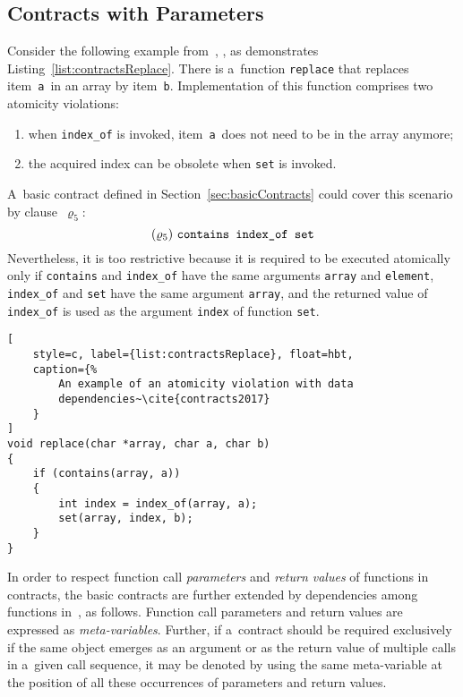 \subsection{Contracts with Parameters}
\label{sec:parameterContracts}

\begin{example}
    Consider the following example from~\cite{contracts2017},
    \cite{contracts2015}, as demonstrates Listing~\ref{list:contractsReplace}.
    There is a~function \texttt{replace} that replaces item~\texttt{a}~in an
    array by item~\texttt{b}. Implementation of this function comprises two
    atomicity violations:
    \begin{enumerate}[label={(\roman*)}]
        \item
            when \texttt{index\_of} is invoked, item~\texttt{a}~does not need to
            be in the array anymore;

        \item
            the acquired index can be obsolete when \texttt{set} is invoked.
    \end{enumerate}
    A~basic contract defined in Section~\ref{sec:basicContracts} could cover
    this scenario by clause~$ \varrho_5 $:
    $$ (\varrho_5)\ \text{\texttt{contains index\_of set}} $$
    Nevertheless, it is too restrictive because it is required to be executed
    atomically only if \texttt{contains} and \texttt{index\_of} have the same
    arguments \texttt{array} and \texttt{element}, \texttt{index\_of} and
    \texttt{set} have the same argument \texttt{array}, and the returned value of
    \texttt{index\_of} is used as the argument \texttt{index} of function
    \texttt{set}.
\end{example}

\begin{lstlisting}[
    style=c, label={list:contractsReplace}, float=hbt,
    caption={%
        An example of an atomicity violation with data
        dependencies~\cite{contracts2017}
    }
]
void replace(char *array, char a, char b)
{
    if (contains(array, a))
    {
        int index = index_of(array, a);
        set(array, index, b);
    }
}
\end{lstlisting}

In order to respect function call \emph{parameters} and \emph{return values}
of functions in contracts, the basic contracts are further extended by
dependencies among functions in~\cite{contracts2017}, \cite{contracts2015}
as follows. Function call parameters and return values are expressed as
\emph{meta-variables}. Further, if a~contract should be required exclusively
if the same object emerges as an argument or as the return value of multiple
calls in a~given call sequence, it may be denoted by using the same
meta-variable at the position of all these occurrences of parameters and
return values.

